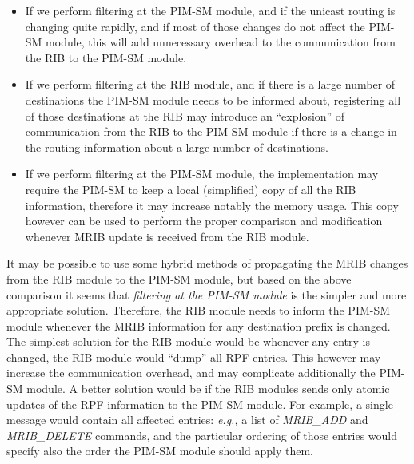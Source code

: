 \documentclass[11pt]{article}
\newcommand{\eg}{\emph{e.g.,}\xspace}
\begin{document}
\begin{itemize}
  
  \item If we perform filtering at the PIM-SM module, and if the unicast
  routing is changing quite rapidly, and if most of those changes do not
  affect the PIM-SM module, this will add unnecessary overhead to the
  communication from the RIB to the PIM-SM module.
  
  \item If we perform filtering at the RIB module, and if there is a
  large number of destinations the PIM-SM module needs to be informed
  about, registering all of those destinations at the RIB may introduce
  an ``explosion'' of communication from the RIB to the PIM-SM module
  if there is a change in the routing information about a large number
  of destinations.
  
  \item If we perform filtering at the PIM-SM module, the implementation
  may require the PIM-SM to keep a local (simplified) copy of all the
  RIB information, therefore it may increase notably the memory usage.
  This copy however can be used to perform the proper comparison and
  modification whenever MRIB update is received from the RIB module.
  
\end{itemize}

It may be possible to use some hybrid methods of propagating the MRIB
changes from the RIB module to the PIM-SM module, but based on the
above comparison it seems that \emph{filtering at the PIM-SM module} is
the simpler and more appropriate solution. Therefore, the RIB module
needs to inform the PIM-SM module whenever the MRIB information for any
destination prefix is changed.  The simplest solution for the RIB
module would be whenever any entry is changed, the RIB module would
``dump'' all RPF entries. This however may increase the communication
overhead, and may complicate additionally the PIM-SM module. A better
solution would be if the RIB modules sends only atomic updates of the
RPF information to the PIM-SM module. For example, a single message
would contain all affected entries: \eg a list of \emph{MRIB\_ADD} and
\emph{MRIB\_DELETE} commands, and the particular ordering of those
entries would specify also the order the PIM-SM module should apply
them.
\end{document}
